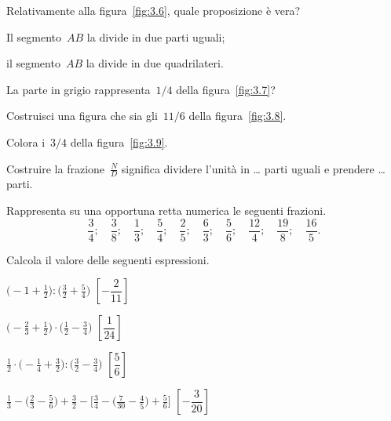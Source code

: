 \begin{esercizio}
\label{ese:3.137}
Relativamente alla figura~\ref{fig:3.6}, quale proposizione è vera?

\begin{enumeratea}
\item Il segmento~$AB$ la divide in due parti uguali;
\item il segmento~$AB$ la divide in due quadrilateri.
\end{enumeratea}
\end{esercizio}

 \begin{esercizio}
 \label{ese:3.138}
La parte in grigio rappresenta~$1/4$ della figura~\ref{fig:3.7}?
\end{esercizio}

\begin{esercizio}
\label{ese:3.139}
 Costruisci una figura che sia gli~$11/6$ della figura~\ref{fig:3.8}.
\end{esercizio}

\begin{esercizio}
\label{ese:3.140}
Colora i~$3/4$ della figura~\ref{fig:3.9}.
\end{esercizio}

\begin{esercizio}
\label{ese:3.141}
Costruire la frazione~$\frac{N}{D}$ significa dividere l'unità in \ldots 
parti uguali e prendere \ldots parti.
\end{esercizio}

\begin{esercizio}
\label{ese:3.142}
Rappresenta su una opportuna retta numerica le seguenti frazioni.
\[\frac{3}{4};\quad\frac{3}{8};\quad\frac{1}{3};\quad\frac{5}{4};\quad
\frac{2}{5};\quad\frac{6}{3};\quad\frac{5}{6};\quad%
\frac{12}{4};\quad\frac{19}{8};\quad\frac{16}{5}.\]
\end{esercizio}

\begin{esercizio}[\Ast]
\label{ese:3.143}
Calcola il valore delle seguenti espressioni.
\begin{enumeratea}
\spazielenx
\item $\displaystyle{\bigg(-1+\frac{1}{2}\bigg):\bigg(\frac{3}{2}+
\frac{5}{4}\bigg)}$
  \hfill \(\left[-\dfrac{2}{11} \right]\)
\item $\displaystyle{\bigg(-{\frac{2}{3}}+\frac{1}{2}\bigg)\cdot
\bigg(\frac{1}{2}-\frac{3}{4}\bigg)}$
  \hfill \(\left[\dfrac{1}{24} \right]\)
\item $\displaystyle{\frac{1}{2}\cdot\bigg(-{\frac{1}{4}}+\frac{3}{2}\bigg):
\bigg(\frac{3}{2}-\frac{3}{4}\bigg)}$
  \hfill \(\left[\dfrac{5}{6} \right]\)
\item $\displaystyle{\frac{1}{3}-\bigg(\frac{2}{3}-\frac{5}{6}\bigg)+
\frac{3}{2}-\bigg[\frac{3}{4}-\bigg(\frac{7}{30}%
-\frac{4}{5}\bigg)+\frac{5}{6}\bigg]}$
  \hfill \(\left[-\dfrac{3}{20} \right]\)
\end{enumeratea}
\end{esercizio}

